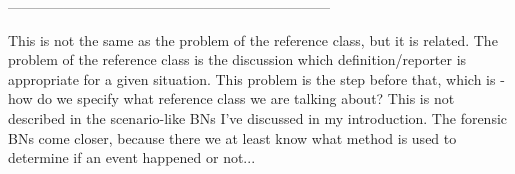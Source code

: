 ---------------------------------------------------------------------

This is not the same as the problem of the reference class, but it is related. The problem of the reference class is the discussion which definition/reporter is appropriate for a given situation. This problem is the step before that, which is - how do we specify what reference class we are talking about? This is not described in the scenario-like BNs I've discussed in my introduction. The forensic BNs come closer, because there we at least know what method is used to determine if an event happened or not...

